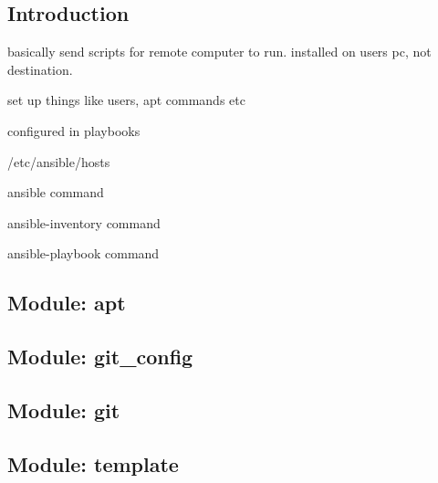 
\subsection{Introduction}

basically send scripts for remote computer to run. installed on users pc, not destination.

set up things like users, apt commands etc

configured in playbooks

/etc/ansible/hosts

ansible command

ansible-inventory command

ansible-playbook command


\subsection{Module: apt}

\subsection{Module: git\_config}

\subsection{Module: git}

\subsection{Module: template}


